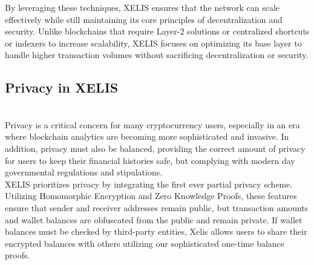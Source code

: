 \documentclass[10pt,a4paper,twocolumn]{article}
\begin{document}
By leveraging these techniques, XELIS ensures that the network can scale effectively while still maintaining its core principles of decentralization and security. Unlike blockchains that require Layer-2 solutions or centralized shortcuts or indexers to increase scalability, XELIS focuses on optimizing its base layer to handle higher transaction volumes without sacrificing decentralization or security.\\


\subsection{Privacy in XELIS}\\

Privacy is a critical concern for many cryptocurrency users, especially in an era where blockchain analytics are becoming more sophisticated and invasive. In addition, privacy must also be balanced, providing the correct amount of privacy for users to keep their financial histories safe, but complying with modern day governmental regulations and stipulations.\\

XELIS prioritizes privacy by integrating the first ever partial privacy scheme. Utilizing Homomorphic Encryption and Zero Knowledge Proofs, these features ensure that sender and receiver addresses remain public, but transaction amounts and wallet balances are obfuscated from the public and remain private. If wallet balances must be checked by third-party entities, Xelis allows users to share their encrypted balances with others utilizing our sophisticated one-time balance proofs.\\
\end{document}
